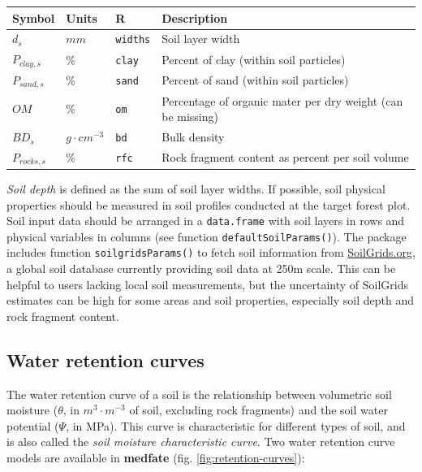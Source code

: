 \documentclass[]{book}
\begin{document}
\begin{longtable}[]{@{}llll@{}}
\toprule
Symbol & Units & R & Description\tabularnewline
\midrule
\endhead
\(d_{s}\) & \(mm\) & \texttt{widths} & Soil layer width\tabularnewline
\(P_{clay,s}\) & \% & \texttt{clay} & Percent of clay (within soil
particles)\tabularnewline
\(P_{sand,s}\) & \% & \texttt{sand} & Percent of sand (within soil
particles)\tabularnewline
\(OM\) & \% & \texttt{om} & Percentage of organic mater per dry weight
(can be missing)\tabularnewline
\(BD_{s}\) & \(g \cdot cm^{-3}\) & \texttt{bd} & Bulk
density\tabularnewline
\(P_{rocks,s}\) & \% & \texttt{rfc} & Rock fragment content as percent
per soil volume\tabularnewline
\bottomrule
\end{longtable}

\emph{Soil depth} is defined as the sum of soil layer widths. If
possible, soil physical properties should be measured in soil profiles
conducted at the target forest plot. Soil input data should be arranged
in a \texttt{data.frame} with soil layers in rows and physical variables
in columns (see function \texttt{defaultSoilParams()}). The package
includes function \texttt{soilgridsParams()} to fetch soil information
from \href{https://soilgrids.org/}{SoilGrids.org}, a global soil
database currently providing soil data at 250m scale. This can be
helpful to users lacking local soil measurements, but the uncertainty of
SoilGrids estimates can be high for some areas and soil properties,
especially soil depth and rock fragment content.

\subsection{Water retention curves}\label{water-retention-curves}

The water retention curve of a soil is the relationship between
volumetric soil moisture (\(\theta\), in \(m^3 \cdot m^{-3}\) of soil,
excluding rock fragments) and the soil water potential (\(\Psi\), in
MPa). This curve is characteristic for different types of soil, and is
also called the \emph{soil moisture characteristic curve}. Two water
retention curve models are available in \textbf{medfate} (fig.
\ref{fig:retention-curves}):
\end{document}

